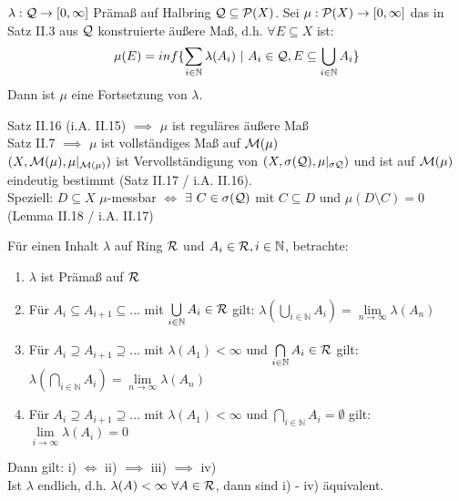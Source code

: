   \begin{theorem}[(i.A. II.30)]
    $\lambda: \mathcal{Q} \to [0, \infty]$ Prämaß auf Halbring $\mathcal{Q} \subseteq \mathcal{P}(X)$. Sei $\mu:\mathcal{P}(X) \to [0,\infty]$ das in Satz II.3 aus $\mathcal{Q}$ konstruierte äußere Maß, d.h. $\forall E \subseteq X$ ist:
    \begin{align*}
      \mu(E) = inf\{\sum\limits_{i \in \mathbb{N}} \lambda(A_i) \ | \ A_i \in \script{Q}, E \subseteq \bigcup\limits_{i \in \mathbb{N}}A_i \}
    \end{align*}
    Dann ist $\mu$ eine Fortsetzung von $\lambda$.
  \end{theorem}

  \begin{remark}
    Satz II.16 (i.A. II.15) $\implies$ $\mu$ ist reguläres äußere Maß\\
    Satz II.7 $\implies$ $\mu$ ist vollständiges Maß auf $\mathcal{M}(\mu)$\\
    $(X, \mathcal{M}(\mu), \mu|_{\mathcal{M}(\mu)})$ ist Vervollständigung von $(X, \sigma(\mathcal{Q}), \mu|_{\sigma{\mathcal{Q}}})$ und ist auf $\mathcal{M}(\mu)$ eindeutig bestimmt (Satz II.17 / i.A. II.16).\\
    Speziell: $D \subseteq X$ $\mu$-messbar $\Leftrightarrow$ $\exists \ C \in \sigma(\mathcal{Q})$ mit $C \subseteq D$ und $\mu(D \setminus C) = 0$ (Lemma II.18 / i.A. II.17)
  \end{remark}

  \begin{theorem}[(i.A. II.31)]
    Für einen Inhalt $\lambda$ auf Ring $\mathcal{R}$ und $A_i \in \mathcal{R}, i \in \mathbb{N}$, betrachte:
    \begin{enumerate}[label=\roman*)]
      \item $\lambda$ ist Prämaß auf $\mathcal{R}$
      \item Für $A_i \subseteq A_{i+1} \subseteq ...$ mit $\bigcup\limits_{i \in \mathbb{N}} A_i \in \mathcal{R}$ gilt: $\lambda(\bigcup\limits_{i \in \mathbb{N}} A_i) = \lim\limits_{n \to \infty} \lambda(A_n)$
      \item Für $A_i \supseteq A_{i+1} \supseteq ...$ mit $\lambda(A_1) < \infty$ und $\bigcap\limits_{i \in \mathbb{N}} A_i \in \mathcal{R}$ gilt:\\
      $\lambda(\bigcap\limits_{i \in \mathbb{N}} A_i) = \lim\limits_{n \to \infty} \lambda(A_n)$
      \item Für $A_i \supseteq A_{i+1} \supseteq ...$ mit $\lambda(A_1) < \infty$ und $\bigcap\limits_{i \in \mathbb{N}} A_i = \emptyset$ gilt: $\lim\limits_{i \to \infty} \lambda(A_i) = 0$
    \end{enumerate} 
    Dann gilt: i) $\Leftrightarrow$ ii) $\implies$ iii) $\implies$ iv)\\
    Ist $\lambda$ endlich, d.h. $\lambda(A) < \infty \ \forall A \in \script{R}$, dann sind i) - iv) äquivalent.
  \end{theorem}

